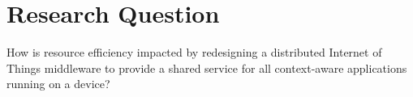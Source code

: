 \section{Research Question}
How is resource efficiency impacted by redesigning a distributed Internet of Things middleware to provide a shared service for all context-aware applications running on a device?
